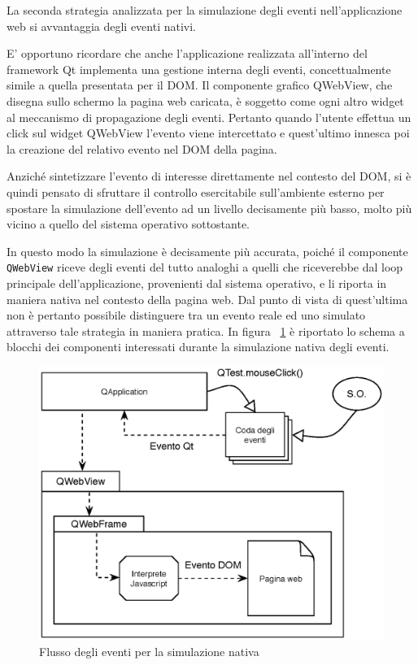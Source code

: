 La seconda strategia analizzata per la simulazione degli eventi nell'applicazione web si avvantaggia degli eventi nativi. 

E' opportuno ricordare che anche l'applicazione realizzata all'interno del framework Qt implementa una gestione interna degli eventi, concettualmente simile a quella presentata per il DOM. Il componente grafico QWebView, che disegna sullo schermo la pagina web caricata, è soggetto come ogni altro widget al meccanismo di propagazione degli eventi. Pertanto quando l'utente effettua un click sul widget QWebView l'evento viene intercettato e quest'ultimo innesca poi la creazione del relativo evento nel DOM della pagina. 

Anziché sintetizzare l'evento di interesse direttamente nel contesto del DOM, si è quindi pensato di sfruttare il controllo esercitabile sull'ambiente esterno per spostare la simulazione dell'evento ad un livello decisamente più basso, molto più vicino a quello del sistema operativo sottostante. 

In questo modo la simulazione è decisamente più accurata, poiché il componente \verb|QWebView| riceve degli eventi del tutto analoghi a quelli che riceverebbe dal loop principale dell'applicazione, provenienti dal sistema operativo, e li riporta in maniera nativa nel contesto della pagina web. Dal punto di vista di quest'ultima non è pertanto possibile distinguere tra un evento reale ed uno simulato attraverso tale strategia in maniera pratica. In figura ~\ref{fig:nativeEvents} è riportato lo schema a blocchi dei componenti interessati durante la simulazione nativa degli eventi.

\begin{figure}[htbp]
\begin{center}
\includegraphics[width=\textwidth]{images/native_events.eps}
\caption{Flusso degli eventi per la simulazione nativa}
\label{fig:nativeEvents}
\end{center}
\end{figure}

